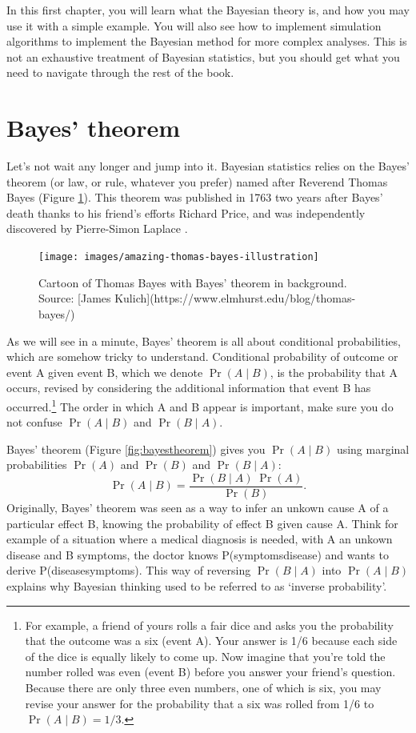 \documentclass[
  12pt,
]{krantz}
\begin{document}
In this first chapter, you will learn what the Bayesian theory is, and how you may use it with a simple example. You will also see how to implement simulation algorithms to implement the Bayesian method for more complex analyses. This is not an exhaustive treatment of Bayesian statistics, but you should get what you need to navigate through the rest of the book.

\hypertarget{bayes-theorem}{%
\section{Bayes' theorem}\label{bayes-theorem}}

Let's not wait any longer and jump into it. Bayesian statistics relies on the Bayes' theorem (or law, or rule, whatever you prefer) named after Reverend Thomas Bayes (Figure \ref{fig:revbayes}). This theorem was published in 1763 two years after Bayes' death thanks to his friend's efforts Richard Price, and was independently discovered by Pierre-Simon Laplace \citep{mcgrayne2011}.

\begin{figure}

{\centering \texttt{[image: images/amazing-thomas-bayes-illustration]} 

}

\caption{Cartoon of Thomas Bayes with Bayes' theorem in background. Source: [James Kulich](https://www.elmhurst.edu/blog/thomas-bayes/)}\label{fig:revbayes}
\end{figure}

As we will see in a minute, Bayes' theorem is all about conditional probabilities, which are somehow tricky to understand. Conditional probability of outcome or event A given event B, which we denote \(\Pr(A \mid B)\), is the probability that A occurs, revised by considering the additional information that event B has occurred.\footnote{For example, a friend of yours rolls a fair dice and asks you the probability that the outcome was a six (event A). Your answer is 1/6 because each side of the dice is equally likely to come up. Now imagine that you're told the number rolled was even (event B) before you answer your friend's question. Because there are only three even numbers, one of which is six, you may revise your answer for the probability that a six was rolled from 1/6 to \(\Pr(A \mid B) = 1/3\).} The order in which A and B appear is important, make sure you do not confuse \(\Pr(A \mid B)\) and \(\Pr(B \mid A)\).

Bayes' theorem (Figure \ref{fig:bayestheorem}) gives you \(\Pr(A \mid B)\) using marginal probabilities \(\Pr(A)\) and \(\Pr(B)\) and \(\Pr(B \mid A)\):
\[\Pr(A \mid B) = \displaystyle{\frac{ \Pr(B \mid A) \; \Pr(A)}{\Pr(B)}}.\]
Originally, Bayes' theorem was seen as a way to infer an unkown cause A of a particular effect B, knowing the probability of effect B given cause A. Think for example of a situation where a medical diagnosis is needed, with A an unkown disease and B symptoms, the doctor knows P(symptoms\textbar disease) and wants to derive P(disease\textbar symptoms). This way of reversing \(\Pr(B \mid A)\) into \(\Pr(A \mid B)\) explains why Bayesian thinking used to be referred to as `inverse probability'.
\end{document}
